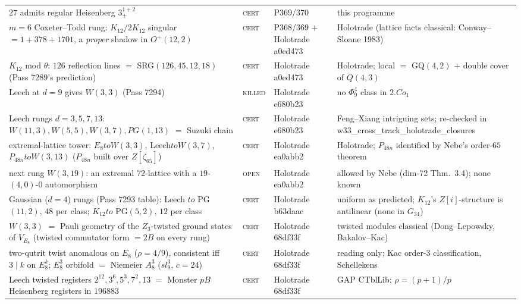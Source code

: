 \documentclass[12pt,a4paper]{article}
\def\mathbb#1{#1}%
\def\mathrm#1{#1}%
\def\mathfrak#1{#1}%
\def\texttt#1{#1}%
\def\Phi#1{Phi#1}%
\def\to{ to }%
\theoremstyle{definition}
\newcommand{\ZZ}{\mathbb{Z}}
\begin{document}
\begin{center}
\begin{tabular}{@{}p{}llp{}@{}}
$27$ admits regular Heisenberg $3^{1+2}_+$ & \textsc{cert} & P369/370 & this programme \\
$m=6$ Coxeter--Todd rung: $K_{12}/2K_{12}$ singular $=1{+}378{+}1701$, a \emph{proper} shadow in $O^+(12,2)$ & \textsc{cert} & P368/369 $+$ Holotrade \texttt{a0ed473} & Holotrade (lattice facts classical: Conway--Sloane 1983) \\
$K_{12}$ mod $\theta$: $126$ reflection lines $=$ SRG$(126,45,12,18)$ (Pass 7289's prediction) & \textsc{cert} & Holotrade \texttt{a0ed473} & Holotrade; local $=$ GQ$(4,2)$ $+$ double cover of $Q(4,3)$ \\
Leech at $d=9$ gives $W(3,3)$ (Pass 7294) & \textsc{killed} & Holotrade \texttt{e680b23} & no $\Phi_9^4$ class in $2.\mathrm{Co}_1$ \\
Leech rungs $d=3,5,7,13$: $W(11,3),W(5,5),W(3,7),PG(1,13)$ $=$ Suzuki chain & \textsc{cert} & Holotrade \texttt{e680b23} & Feng--Xiang intriguing sets; re-checked in \texttt{w33\_cross\_track\_holotrade\_closures} \\
extremal-lattice tower: $E_8{\to}W(3,3)$, Leech${\to}W(3,7)$, $P_{48n}{\to}W(3,13)$ ($P_{48n}$ built over $\ZZ[\zeta_{65}]$) & \textsc{cert} & Holotrade \texttt{ea0abb2} & Holotrade; $P_{48n}$ identified by Nebe's order-$65$ theorem \\
next rung $W(3,19)$: an extremal $72$-lattice with a $19$-$(4,0)$-$0$ automorphism & \textsc{open} & Holotrade \texttt{ea0abb2} & allowed by Nebe (dim-72 Thm.~3.4); none known \\
Gaussian ($d=4$) rungs (Pass 7293 table): Leech $\to$ PG$(11,2)$, $48$ per class; $K_{12}\to$ PG$(5,2)$, $12$ per class & \textsc{cert} & Holotrade \texttt{b63daac} & uniform as predicted; $K_{12}$'s $\ZZ[i]$-structure is antilinear (none in $G_{34}$) \\
$W(3,3)$ $=$ Pauli geometry of the $\ZZ_3$-twisted ground states of $V_{E_8}$ (twisted commutator form $=2B$ on every rung) & \textsc{cert} & Holotrade \texttt{68df33f} & twisted modules classical (Dong--Lepowsky, Bakalov--Kac) \\
two-qutrit twist anomalous on $E_8$ ($\rho=4/9$), consistent iff $3\mid k$ on $E_8^k$; $E_8^3$ orbifold $=$ Niemeier $A_8^3$ ($\mathfrak{sl}_9^3$, $c=24$) & \textsc{cert} & Holotrade \texttt{68df33f} & reading only; Kac order-3 classification, Schellekens \\
Leech twisted registers $2^{12},3^6,5^3,7^2,13$ $=$ Monster $pB$ Heisenberg registers in $196883$ & \textsc{cert} & Holotrade \texttt{68df33f} & GAP CTblLib; $\rho=(p{+}1)/p$ \\

\end{tabular}
\end{center}
\end{document}
